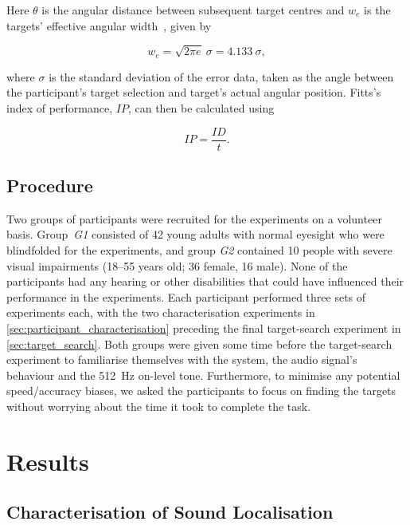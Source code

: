 \documentclass[acmsmall]{acmart}
\begin{document}
\noindent
Here $\theta$ is the angular distance between subsequent target centres and $w_e$ is the targets' effective angular width~\citep{welford1968fundamentals}, given by

\begin{equation}
  \label{eq:fitts-we}
  w_e = \sqrt{2\pi e}~\sigma = 4.133~\sigma,
\end{equation}

\noindent
where $\sigma$ is the standard deviation of the error data, taken as the angle between the participant's target selection and target's actual angular position.
Fitts's index of performance, $IP$, can then be calculated using 

\begin{equation}
  \label{eq:fitts-performance}
  IP = \frac{ID}{t}.
\end{equation}

\subsection{Procedure}

Two groups of participants were recruited for the experiments on a volunteer basis. 
Group~\textit{G1} consisted of 42 young adults with normal eyesight who were blindfolded for the experiments, and group \textit{G2} contained 10 people with severe visual impairments (18--55 years old; 36 female, 16 male). 
None of the participants had any hearing or other disabilities that could have influenced their performance in the experiments.
Each participant performed three sets of experiments each, with the two characterisation experiments in \cref{sec:participant_characterisation} preceding the final target-search experiment in \cref{sec:target_search}. 
Both groups were given some time before the target-search experiment to familiarise themselves with the system, the audio signal's behaviour and the \SI{512}{\hertz} on-level tone. 
Furthermore, to minimise any potential speed/accuracy biases, we asked the participants to focus on finding the targets without worrying about the time it took to complete the task. 

\section{Results}\label{sec:results}

\subsection{Characterisation of Sound Localisation}
\end{document}
